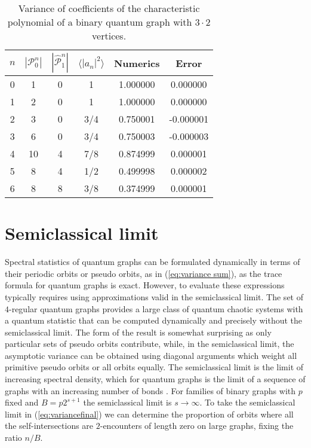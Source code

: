 \documentclass[doublecol]{epl2}
\begin{document}
\begin{table}[htbp!]
	\caption{Variance of coefficients of the characteristic polynomial of a binary quantum graph with $3\cdot 2$ vertices.}
		\label{table binary 6}
		\begin{center}
	\begin{tabular}{ c c c c c c }
		$n$ & $|\mathcal{P}_0^n|$ & $|\widehat{\mathcal{P}}_{1}^n|$ 
		& $\langle |a_n|^2 \rangle$ 
		& Numerics & Error \\
		\hline
		0 & 1 & 0 & 1 & 1.000000 & 0.000000 \\
		1 & 2 & 0 & 1 & 1.000000 & 0.000000 \\
		2 & 3 & 0 & 3/4 & 0.750001 & -0.000001 \\
		3 & 6 & 0 & 3/4 & 0.750003 & -0.000003 \\
		4 & 10 & 4 & 7/8 & 0.874999 & 0.000001 \\
		5 & 8 & 4 & 1/2 & 0.499998 & 0.000002 \\
		6 & 8 & 8 & 3/8 & 0.374999 & 0.000001 \\
		\hline
	\end{tabular}
\end{center}
\end{table}

\section{Semiclassical limit}

{ Spectral statistics of quantum graphs can be formulated dynamically in terms of their periodic orbits or pseudo orbits, as in (\ref{eq:variance sum}), as the trace formula for quantum graphs is exact.  However, to evaluate these expressions typically requires using approximations valid in the semiclassical limit.}
The set of $4$-regular quantum graphs provides a large class of quantum chaotic systems with a quantum statistic that can be computed dynamically and precisely without the semiclassical limit.
The form of the result is somewhat surprising as only particular sets of pseudo orbits contribute, while, in the semiclassical limit, the asymptotic variance can be obtained using diagonal arguments which weight all primitive pseudo orbits \cite{BHS19} or all orbits \cite{T02} equally.  The semiclassical limit is the limit of increasing spectral density, which for quantum graphs is the limit of a sequence of graphs with an increasing number of bonds \cite{BerkolaikoKuchment,KS97,GS06}.  For families of binary graphs with $p$ fixed and $B=p2^{s+1}$ the semiclassical limit is $s\to \infty$.   To take the semiclassical limit in  (\ref{eq:variancefinal}) we can determine the proportion of orbits where all the self-intersections are  $2$-encounters of length zero on large graphs, fixing the ratio $n/B$.    
\end{document}
